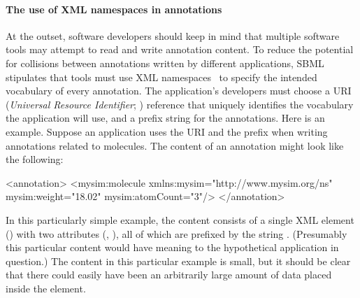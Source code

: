 \paragraph{The use of XML namespaces in annotations}


At the outset, software developers should keep in mind that
multiple software tools may attempt to read and write annotation
content.  To reduce the potential for collisions between
annotations written by different applications, SBML \thisLV
stipulates that tools must use XML namespaces~\citep{bray:1999} to
specify the intended vocabulary of every annotation.  The
application's developers must choose a URI (\emph{Universal
  Resource Identifier}; \citealt{harold:2001,w3c:2000}) reference
that uniquely identifies the vocabulary the application will use,
and a prefix string for the annotations.  Here is an example.
Suppose an application uses the URI 
and the prefix  when writing annotations related to 
molecules.  The content of an annotation might look like the
following:

\begin{example}
<annotation>
    <mysim:molecule xmlns:mysim="http://www.mysim.org/ns"
         mysim:weight="18.02" mysim:atomCount="3"/>
</annotation>
\end{example}

In this particularly simple example, the content consists of a single
XML element () with two attributes
(, ), all of which are prefixed by
the string .  (Presumably this particular content
would have meaning to the hypothetical application in question.)
The content in this particular example is small, but it should be
clear that there could easily have been an arbitrarily large
amount of data placed inside the  element.


